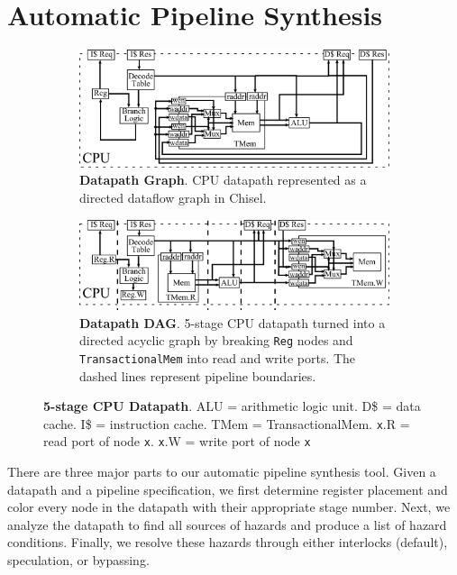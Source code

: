 \section{Automatic Pipeline Synthesis}
\begin{figure}[htb]
\centering
  \begin{subfigure}[t]{0.8\textwidth}
  \centering
  \includegraphics[width=\textwidth]{figures/pipeline.pdf}
  \caption{{\bf Datapath Graph}. CPU datapath represented as a
    directed dataflow graph in Chisel.}
  \label{fig:datapathgrah}
  \end{subfigure}
  \begin{subfigure}[t]{0.8\textwidth}
  \vspace{20pt}
  \centering
  \includegraphics[width=\textwidth]{figures/pipelinedag.pdf}
  \caption{{\bf Datapath DAG}. 5-stage CPU datapath turned into a
    directed acyclic graph by breaking {\tt Reg} nodes and {\tt
      TransactionalMem} into read and write ports. The dashed lines
    represent pipeline boundaries.}
  \label{fig:datapathdag}
  \end{subfigure}
\caption{{\bf 5-stage CPU Datapath}. ALU = arithmetic logic unit. D\$
  = data cache. I\$ =  instruction cache. TMem =
  TransactionalMem. {\tt x}.R = read port of node {\tt x}. {\tt x}.W =
  write port of node {\tt x}}
\label{fig:datapath}
\end{figure}

There are three major parts to our automatic pipeline synthesis
tool. Given a datapath and a pipeline specification, we first
determine register placement and color every node in the datapath with
their appropriate stage number. Next, we analyze the datapath to find
all sources of hazards and produce a list of hazard
conditions. Finally, we resolve these hazards through either
interlocks (default), speculation, or bypassing.

